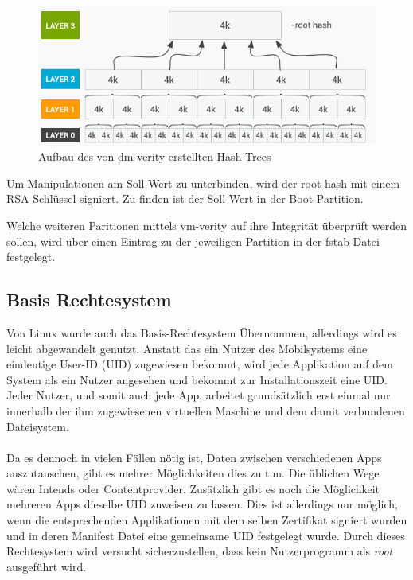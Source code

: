 	\begin{figure}[h]
		\centering
		\includegraphics[width=0.7\linewidth]{android_pages/graphics/dm-verity-table}
		\caption[Aufbau des Hash-Trees]{Aufbau des von dm-verity erstellten Hash-Trees\protect\cite{VerifiedBoot}}
		\label{fig:dm-verity-table}
	\end{figure}
	
\begin{flushleft}
	Um Manipulationen am Soll-Wert zu unterbinden, wird der root-hash mit einem RSA Schlüssel signiert. Zu finden ist der Soll-Wert in der Boot-Partition.\\
\end{flushleft}
	Welche weiteren Paritionen mittels vm-verity auf ihre Integrität überprüft werden sollen, wird über einen Eintrag zu der jeweiligen Partition in der fstab-Datei festgelegt.

	\subsection{Basis Rechtesystem}\label{sec:BasisRechteSystem}
	Von Linux wurde auch das Basis-Rechtesystem Übernommen, allerdings wird es leicht abgewandelt genutzt. Anstatt das ein Nutzer des Mobilsystems eine eindeutige User-ID (UID) zugewiesen bekommt, wird jede Applikation auf dem System als ein Nutzer angesehen und bekommt zur Installationszeit eine UID. Jeder Nutzer, und somit auch jede App, arbeitet grundsätzlich erst einmal nur innerhalb der ihm zugewiesenen virtuellen Maschine und dem damit verbundenen Dateisystem.\\\\
	Da es dennoch in vielen Fällen nötig ist, Daten zwischen verschiedenen Apps auszutauschen, gibt es mehrer Möglichkeiten dies zu tun. Die üblichen Wege wären Intends oder Contentprovider. Zusätzlich gibt es noch die Möglichkeit mehreren Apps dieselbe UID zuweisen zu lassen. Dies ist allerdings nur möglich, wenn die entsprechenden Applikationen mit dem selben Zertifikat signiert wurden und in deren Manifest Datei eine gemeinsame UID festgelegt wurde.
	Durch dieses Rechtesystem wird versucht sicherzustellen, dass kein Nutzerprogramm als \textit{root} ausgeführt wird.
	
